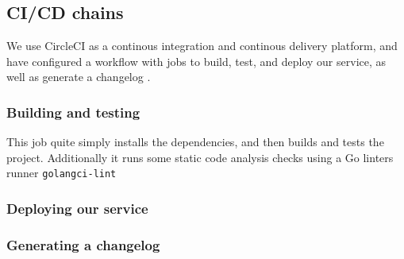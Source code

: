 \subsection{CI/CD chains}

We use CircleCI as a continous integration and continous delivery platform, and have configured a workflow with jobs to build, test, and deploy our service, as well as generate a changelog \cite{workflow:circleci}.


\subsubsection{Building and testing}

This job quite simply installs the dependencies, and then builds and tests the project. Additionally it runs some static code analysis checks using a Go linters runner \texttt{golangci-lint}


\subsubsection{Deploying our service}




\subsubsection{Generating a changelog}


